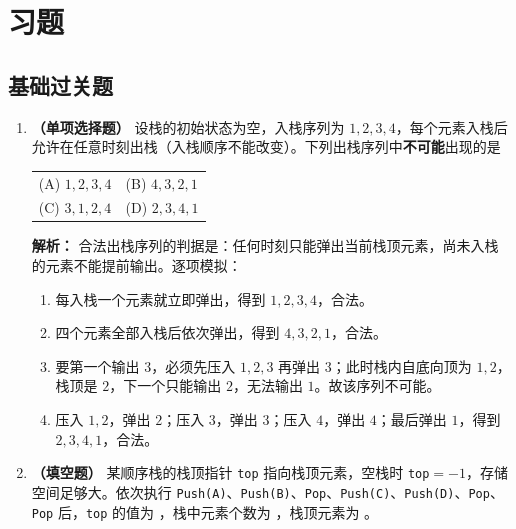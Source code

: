 \section{习题}

\subsection{基础过关题}

\begin{enumerate}

\item \textbf{（单项选择题）} 设栈的初始状态为空，入栈序列为 $1,2,3,4$，每个元素入栈后允许在任意时刻出栈（入栈顺序不能改变）。下列出栈序列中\textbf{不可能}出现的是
\begin{center}
\begin{tabular}{ll}
(A) $1,2,3,4$ & (B) $4,3,2,1$ \\[6pt]
(C) $3,1,2,4$ & (D) $2,3,4,1$
\end{tabular}
\end{center}

\ifshowsolutions\par\noindent\textbf{解析：} 合法出栈序列的判据是：任何时刻只能弹出当前栈顶元素，尚未入栈的元素不能提前输出。逐项模拟：
\begin{enumerate}
\item[(A)] 每入栈一个元素就立即弹出，得到 $1,2,3,4$，合法。
\item[(B)] 四个元素全部入栈后依次弹出，得到 $4,3,2,1$，合法。
\item[(C)] 要第一个输出 $3$，必须先压入 $1,2,3$ 再弹出 $3$；此时栈内自底向顶为 $1,2$，栈顶是 $2$，下一个只能输出 $2$，无法输出 $1$。故该序列不可能。
\item[(D)] 压入 $1,2$，弹出 $2$；压入 $3$，弹出 $3$；压入 $4$，弹出 $4$；最后弹出 $1$，得到 $2,3,4,1$，合法。
\end{enumerate}
\par\noindent{}\else \answerarea \fi

\item \textbf{（填空题）} 某顺序栈的栈顶指针 \texttt{top} 指向栈顶元素，空栈时 \texttt{top}$=-1$，存储空间足够大。依次执行 \texttt{Push(A)}、\texttt{Push(B)}、\texttt{Pop}、\texttt{Push(C)}、\texttt{Push(D)}、\texttt{Pop}、\texttt{Pop} 后，\texttt{top} 的值为 \underline{\qquad}，栈中元素个数为 \underline{\qquad}，栈顶元素为 \underline{\qquad}。


\end{enumerate}
